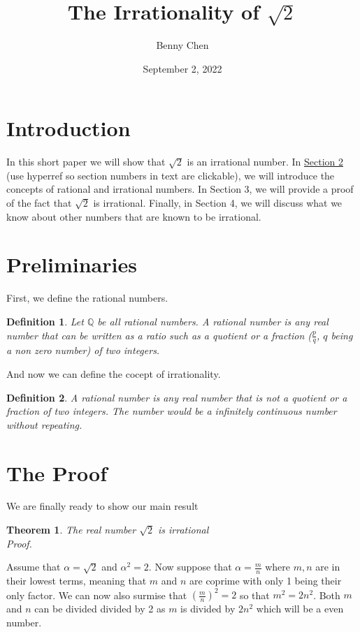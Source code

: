 \documentclass{article}
\title{The Irrationality of $\sqrt{2}$}
\author{Benny Chen}
\date{September 2, 2022}
\newtheorem{Definition}{Definition}
\newtheorem{Theorem}{Theorem}
\begin{document}
\maketitle

\section{Introduction}
In this short paper we will show that $\sqrt{2}$ is an irrational number. 
In \hyperref[sec:Preliminaries]{Section 2} (use hyperref so section numbers in text are clickable), we 
will introduce the concepts of rational and irrational numbers. In Section 3, 
we will provide a proof of the fact that $\sqrt{2}$ is irrational. Finally, in 
Section 4, we will discuss what we know about other numbers that are known to be irrational.

\section{Preliminaries}
\label{sec:Preliminaries}
First, we define the rational numbers.
\begin{Definition}
Let $\mathbb{Q}$ be all rational numbers. A rational number is any real number that can be written as a 
ratio such as a quotient or a fraction ($\frac{p}{q}$, $q$ being a non zero number) of two integers.


\end{Definition}
And now we can define the cocept of irrationality.
\begin{Definition}
A rational number is any real number that is not a quotient or a fraction of two integers. The number
would be a infinitely continuous number without repeating.
\end{Definition}

\section{The Proof}
We are finally ready to show our main result
\begin{Theorem}
    The real number $\sqrt{2}$ is irrational\\
    Proof. 
\end{Theorem}
Assume that $\alpha = \sqrt{2}$ and $\alpha^{2} = 2$. Now suppose that $\alpha = \frac{m}{n}$ where
$m, n$ are in their lowest terms, meaning that $m$ and $n$ are coprime with only 1 being their only factor. 
We can now also surmise that $(\frac{m}{n})^2 = 2$ so that $m^2 = 2n^2$. Both $m$ and $n$ can be divided divided by 2 as 
$m$ is divided by $2n^2$ which will be a even number. 
\end{document}
